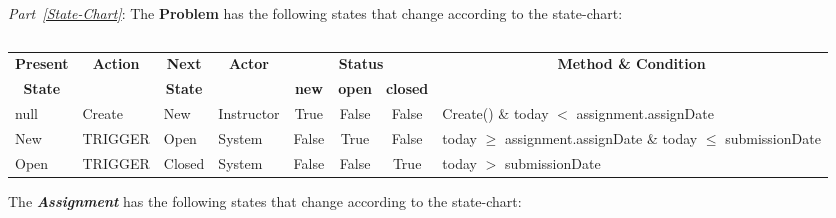 \documentclass{article}
\begin{document}
\begin{enumerate}
{\em Part~\ref{State-Chart}}: The {\bf Problem} has the following states that change according to the state-chart:

\begin{center}
\begin{tabular}{|l|} \hline
\\ \hline
\end{tabular}
\end{center}

\begin{center}
\begin{scriptsize}
\begin{tabular}{|l|l|l|l|c|c|c|l|} \hline
\multicolumn{1}{|c}{\bf Present} &
\multicolumn{1}{|c}{\bf Action} &
\multicolumn{1}{|c}{\bf Next} &
\multicolumn{1}{|c}{\bf Actor} &
\multicolumn{3}{|c}{\bf Status} &
\multicolumn{1}{|c|}{\bf Method \& Condition} \\ \cline{5-7}
\multicolumn{1}{|c}{\bf State} &
\multicolumn{1}{|c}{\bf } &
\multicolumn{1}{|c}{\bf State} &
\multicolumn{1}{|c}{\bf } &
\multicolumn{1}{|c}{\bf new} &
\multicolumn{1}{|c}{\bf open} &
\multicolumn{1}{|c}{\bf closed} &
\multicolumn{1}{|c|}{\bf } \\ \hline
null 			& Create 	& \textsf{New} 		& Instructor& True 	& False & False & Create() \& \textsf{today} $<$ \textsf{assignment.assignDate} \\ \hline
\textsf{New}	& TRIGGER 	& \textsf{Open} 	& System 	& False & True 	& False & \textsf{today} $\geq$ \textsf{assignment.assignDate} \& \textsf{today} $\leq$ \textsf{submissionDate} \\ \hline
\textsf{Open} 	& TRIGGER 	& \textsf{Closed} 	& System 	& False & False & True & \textsf{today} $>$ \textsf{submissionDate} \\ \hline
\end{tabular}
\end{scriptsize}
\end{center}

The {\bf \em Assignment} has the following states that change according to the state-chart:

\begin{center}
\begin{tabular}{|l|} \hline
\\ \hline
\end{tabular}
\end{center}


\end{enumerate}
\end{document}

